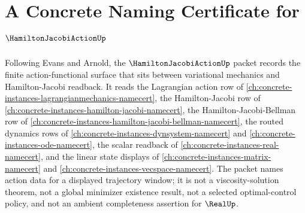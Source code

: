 \chapter{A Concrete Naming Certificate for $\HamiltonJacobiActionUp$}
\label{ch:concrete-instances-hamilton-jacobi-action-namecert}

Following Evans and Arnold, the $\HamiltonJacobiActionUp$ packet records the finite action-functional surface that sits between variational mechanics and Hamilton-Jacobi readback. It reads the Lagrangian action row of \autoref{ch:concrete-instances-lagrangianmechanics-namecert}, the Hamilton-Jacobi row of \autoref{ch:concrete-instances-hamilton-jacobi-namecert}, the Hamilton-Jacobi-Bellman row of \autoref{ch:concrete-instances-hamilton-jacobi-bellman-namecert}, the routed dynamics rows of \autoref{ch:concrete-instances-dynsystem-namecert} and \autoref{ch:concrete-instances-ode-namecert}, the scalar readback of \autoref{ch:concrete-instances-real-namecert}, and the linear state displays of \autoref{ch:concrete-instances-matrix-namecert} and \autoref{ch:concrete-instances-vecspace-namecert}. The packet names action data for a displayed trajectory window; it is not a viscosity-solution theorem, not a global minimizer existence result, not a selected optimal-control policy, and not an ambient completeness assertion for $\RealUp$.

